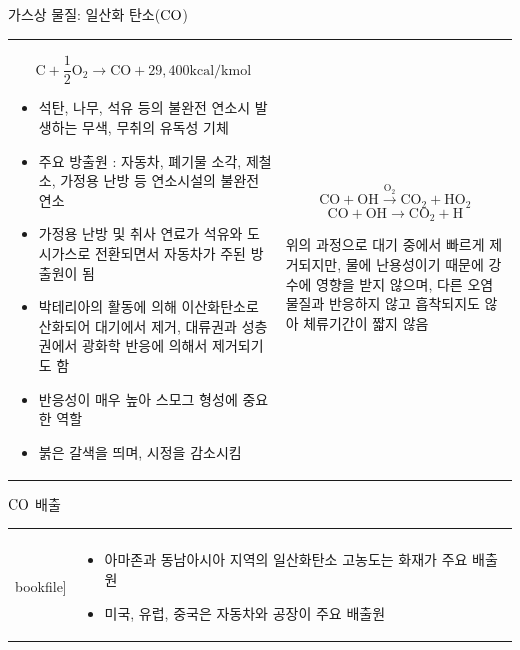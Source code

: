\begin{frame}[t]{가스상 물질: 일산화 탄소($\rm{{CO}}$)}
	\begin{tabular}{ll}
		\begin{minipage}[t]{0.475\textwidth}\scriptsize
			$$
				\mathrm{C}+\frac{1}{2} \mathrm{O}_{2} \longrightarrow \mathrm{CO}+29,400 \mathrm{kcal} / \mathrm{kmol}
			$$
			\begin{itemize}
				\item 석탄, 나무, 석유 등의 불완전 연소시 발생하는 무색, 무취의 유독성 기체
				\item 주요 방출원 : 자동차, 폐기물 소각, 제철소, 가정용 난방 등 연소시설의 불완전 연소
				\item 가정용 난방 및 취사 연료가 석유와 도시가스로 전환되면서 자동차가 주된 방출원이 됨
				\item 박테리아의 활동에 의해 이산화탄소로 산화되어 대기에서 제거, 대류권과 성층권에서 광화학 반응에 의해서 제거되기도 함
				\item 반응성이 매우 높아 스모그 형성에 중요한 역할
				\item 붉은 갈색을 띄며, 시정을 감소시킴
			\end{itemize}

		\end{minipage}	
		&
		\begin{minipage}[t]{0.475\textwidth} \scriptsize	
			
			$$
				\mathrm{CO}+\mathrm{OH} \stackrel{\mathrm{O}_{2}}{\longrightarrow} \mathrm{CO}_{2}+\mathrm{HO}_{2} 
			$$
			$$
				\mathrm{CO}+\mathrm{OH} \longrightarrow \mathrm{CO}_{2}+\mathrm{H}
			$$
				
			위의 과정으로 대기 중에서 빠르게 제거되지만, 물에 난용성이기 때문에 강수에 영향을 받지 않으며, 다른 오염물질과 반응하지 않고 흡착되지도 않아 체류기간이 짧지 않음
			
		\end{minipage}
	\end{tabular}
\end{frame}



\begin{frame}[t]{$\rm{{CO}}$ 배출}
	\begin{tabular}{ll}
		\begin{minipage}[t]{0.5\textwidth}\scriptsize
			\begin{figure}[t]
				\texttt{[image: \\bookfile]}
			\end{figure}
		\end{minipage}	
		&
		\begin{minipage}[t]{0.45\textwidth} \scriptsize	
			\begin{itemize}
				\item 아마존과 동남아시아 지역의 일산화탄소 고농도는 화재가 주요 배출원
				\item 미국, 유럽, 중국은 자동차와 공장이 주요 배출원
			\end{itemize}
		\end{minipage}
	\end{tabular}
\end{frame}




